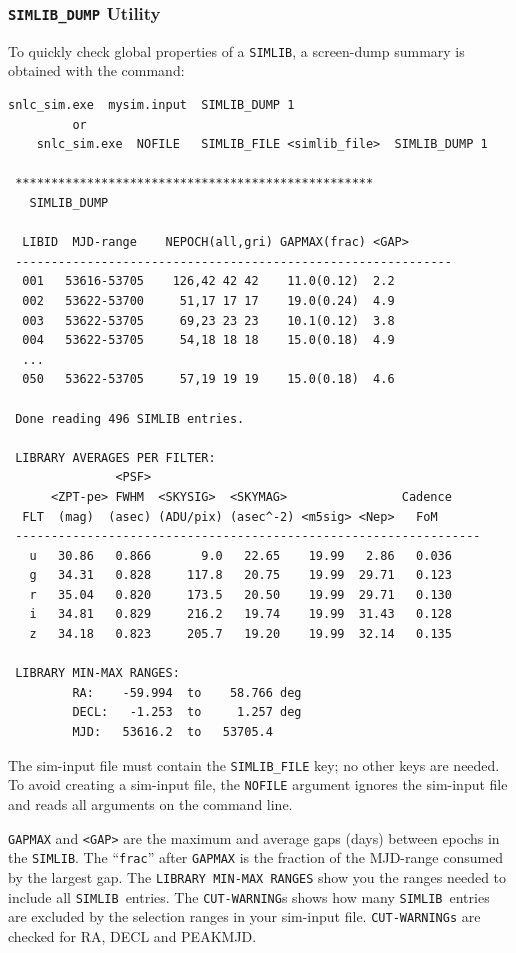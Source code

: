 \documentclass[12pt]{article}
\newcommand{\simlib}{{\tt SIMLIB}}
\begin{document}
   \clearpage
   \subsubsection{{\tt SIMLIB\_DUMP} Utility }
   \label{sss:simlib_dump}

To quickly check global properties of a  \simlib,
a screen-dump summary is obtained with the command:
%
\begin{Verbatim}[frame=single]
    snlc_sim.exe  mysim.input  SIMLIB_DUMP 1
         or
    snlc_sim.exe  NOFILE   SIMLIB_FILE <simlib_file>  SIMLIB_DUMP 1
         
 ************************************************** 
   SIMLIB_DUMP  

  LIBID  MJD-range    NEPOCH(all,gri) GAPMAX(frac) <GAP> 
 ------------------------------------------------------------- 
  001   53616-53705    126,42 42 42    11.0(0.12)  2.2 
  002   53622-53700     51,17 17 17    19.0(0.24)  4.9 
  003   53622-53705     69,23 23 23    10.1(0.12)  3.8 
  004   53622-53705     54,18 18 18    15.0(0.18)  4.9 
  ...
  050   53622-53705     57,19 19 19    15.0(0.18)  4.6 

 Done reading 496 SIMLIB entries. 

 LIBRARY AVERAGES PER FILTER:  
               <PSF>  
      <ZPT-pe> FWHM  <SKYSIG>  <SKYMAG>                Cadence 
  FLT  (mag)  (asec) (ADU/pix) (asec^-2) <m5sig> <Nep>   FoM   
 ----------------------------------------------------------------- 
   u   30.86   0.866       9.0   22.65    19.99   2.86   0.036 
   g   34.31   0.828     117.8   20.75    19.99  29.71   0.123 
   r   35.04   0.820     173.5   20.50    19.99  29.71   0.130 
   i   34.81   0.829     216.2   19.74    19.99  31.43   0.128 
   z   34.18   0.823     205.7   19.20    19.99  32.14   0.135 

 LIBRARY MIN-MAX RANGES:  
         RA:    -59.994  to    58.766 deg 
         DECL:   -1.253  to     1.257 deg 
         MJD:   53616.2  to   53705.4 
\end{Verbatim}
%
The sim-input file must contain the {\tt SIMLIB\_FILE} key;
no other keys are needed. To avoid creating a sim-input file,
the {\tt NOFILE} argument ignores the sim-input file and reads
all arguments on the command line.

{\tt GAPMAX} and {\tt <GAP>} are the 
maximum and average gaps (days) between epochs in the {\tt SIMLIB}.
The ``{\tt frac}'' after {\tt GAPMAX} is the fraction of the
MJD-range consumed by the largest gap.
The {\tt LIBRARY MIN-MAX RANGES} show you the ranges
needed to include all \simlib\ entries. 
The {\tt CUT-WARNING}s  shows how many \simlib\ entries
are excluded by the selection ranges in your sim-input file.
{\tt CUT-WARNINGs} are checked for RA, DECL and PEAKMJD.
\end{document}
